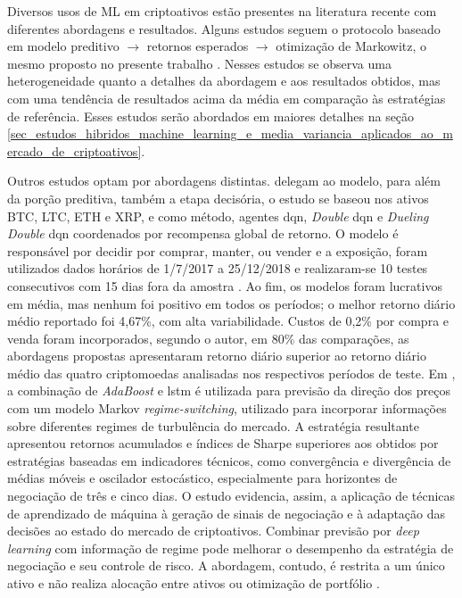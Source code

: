 Diversos usos de ML em criptoativos estão presentes na literatura recente com diferentes abordagens e resultados. Alguns estudos seguem o protocolo baseado em modelo preditivo \(\longrightarrow\) retornos esperados \(\longrightarrow\) otimização de Markowitz, o mesmo proposto no presente trabalho \cite{zhou2023multisource,lorenzo2023online,cui2023portfolio,xu2025cryptocurrency}. Nesses estudos se observa uma heterogeneidade quanto a detalhes da abordagem e aos resultados obtidos, mas com uma tendência de resultados acima da média em comparação às estratégias de referência. Esses estudos serão abordados em maiores detalhes na seção \ref{sec_estudos_hibridos_machine_learning_e_media_variancia_aplicados_ao_mercado_de_criptoativos}.

Outros estudos optam por abordagens distintas.  delegam ao modelo, para além da porção preditiva, também a etapa decisória, o estudo se baseou nos ativos BTC, LTC, ETH e XRP, e como método, agentes \ac{dqn}, \textit{Double} \acs{dqn} e \textit{Dueling Double} \acs{dqn} coordenados por recompensa global de retorno. O modelo é responsável por decidir por comprar, manter, ou vender e a exposição, foram utilizados dados horários de 1/7/2017 a 25/12/2018 e realizaram-se 10 testes consecutivos com 15 dias fora da amostra \cite{lucarelli2020deepq}. Ao fim, os modelos foram lucrativos em média, mas nenhum foi positivo em todos os períodos; o melhor retorno diário médio reportado foi 4,67\%, com alta variabilidade. Custos de 0,2\% por compra e venda foram incorporados, segundo o autor, em 80\% das comparações, as abordagens propostas apresentaram retorno diário superior ao retorno diário médio das quatro criptomoedas analisadas nos respectivos períodos de teste. Em , a combinação de \textit{AdaBoost} e \acs{lstm} é utilizada para previsão da direção dos preços com um modelo Markov \textit{regime-switching}, utilizado para incorporar informações sobre diferentes regimes de turbulência do mercado. A estratégia resultante apresentou retornos acumulados e índices de Sharpe superiores aos obtidos por estratégias baseadas em indicadores técnicos, como convergência e divergência de médias móveis e oscilador estocástico, especialmente para horizontes de negociação de três e cinco dias. O estudo evidencia, assim, a aplicação de técnicas de aprendizado de máquina à geração de sinais de negociação e à adaptação das decisões ao estado do mercado de criptoativos. Combinar previsão por \textit{deep learning} com informação de regime pode melhorar o desempenho da estratégia de negociação e seu controle de risco. A abordagem, contudo, é restrita a um único ativo e não realiza alocação entre ativos ou otimização de portfólio \cite{park2023intelligent}. 

